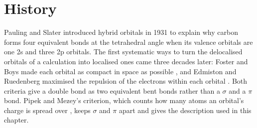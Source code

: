 \section{History}
Pauling \cite{pauling1931} and Slater \cite{slater1931} introduced hybrid orbitals in 1931 to explain why carbon forms four equivalent bonds at the tetrahedral angle when its valence orbitals are one 2s and three 2p orbitals. The first systematic ways to turn the delocalised orbitals of a calculation into localised ones came three decades later: Foster and Boys made each orbital as compact in space as possible \cite{foster1960}, and Edmiston and Ruedenberg maximised the repulsion of the electrons within each orbital \cite{edmiston1963}. Both criteria give a double bond as two equivalent bent bonds rather than a $\sigma$ and a $\pi$ bond. Pipek and Mezey's criterion, which counts how many atoms an orbital's charge is spread over \cite{pipek1989}, keeps $\sigma$ and $\pi$ apart and gives the description used in this chapter.
